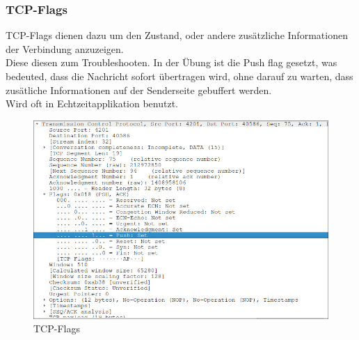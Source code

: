\documentclass[a4paper]{article}
\begin{document}
\subsubsection{TCP-Flags}
TCP-Flags dienen dazu um den Zustand, oder andere zusätzliche Informationen der Verbindung anzuzeigen.\\
Diese diesen zum Troubleshooten.
In der Übung ist die Push flag gesetzt, was bedeuted, dass die Nachricht sofort übertragen wird, ohne darauf zu warten, dass zusätliche Informationen auf der Senderseite gebuffert werden.\cite{TCP-Flags}
\\ Wird oft in Echtzeitapplikation benutzt.
\begin{figure}[h]
	\includegraphics[scale=0.5]{images/tcp-flags.jpeg}
	\caption{TCP-Flags}
\end{figure}
\newpage
\end{document}

